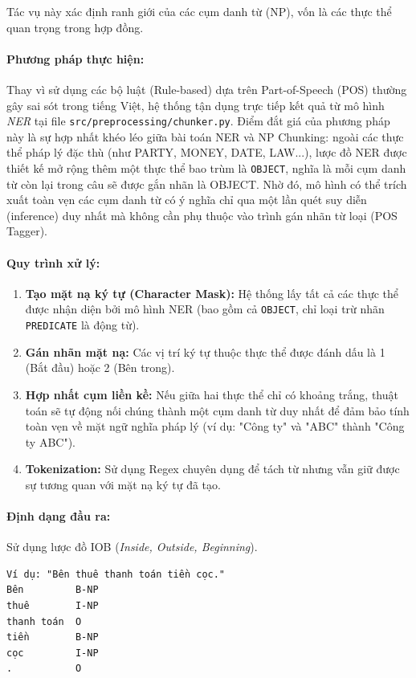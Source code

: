 Tác vụ này xác định ranh giới của các cụm danh từ (NP), vốn là các thực thể quan trọng trong hợp đồng.

\paragraph{Phương pháp thực hiện:}
Thay vì sử dụng các bộ luật (Rule-based) dựa trên Part-of-Speech (POS) thường gây sai sót trong tiếng Việt, hệ thống tận dụng trực tiếp kết quả từ mô hình \textit{NER} tại file \texttt{src/preprocessing/chunker.py}. Điểm đắt giá của phương pháp này là sự hợp nhất khéo léo giữa bài toán NER và NP Chunking: ngoài các thực thể pháp lý đặc thù (như PARTY, MONEY, DATE, LAW...), lược đồ NER được thiết kế mở rộng thêm một thực thể bao trùm là \texttt{OBJECT}, nghĩa là mỗi cụm danh từ còn lại trong câu sẽ được gắn nhãn là OBJECT. Nhờ đó, mô hình có thể trích xuất toàn vẹn các cụm danh từ có ý nghĩa chỉ qua một lần quét suy diễn (inference) duy nhất mà không cần phụ thuộc vào trình gán nhãn từ loại (POS Tagger).

\paragraph{Quy trình xử lý:}
\begin{enumerate}
    \item \textbf{Tạo mặt nạ ký tự (Character Mask):} Hệ thống lấy tất cả các thực thể được nhận diện bởi mô hình NER (bao gồm cả \texttt{OBJECT}, chỉ loại trừ nhãn \texttt{PREDICATE} là động từ).
    \item \textbf{Gán nhãn mặt nạ:} Các vị trí ký tự thuộc thực thể được đánh dấu là 1 (Bắt đầu) hoặc 2 (Bên trong).
    \item \textbf{Hợp nhất cụm liền kề:} Nếu giữa hai thực thể chỉ có khoảng trắng, thuật toán sẽ tự động nối chúng thành một cụm danh từ duy nhất để đảm bảo tính toàn vẹn về mặt ngữ nghĩa pháp lý (ví dụ: "Công ty" và "ABC" thành "Công ty ABC").
    \item \textbf{Tokenization:} Sử dụng Regex chuyên dụng để tách từ nhưng vẫn giữ được sự tương quan với mặt nạ ký tự đã tạo.
\end{enumerate}

\paragraph{Định dạng đầu ra:} Sử dụng lược đồ IOB (\textit{Inside, Outside, Beginning}).
\begin{verbatim}
Ví dụ: "Bên thuê thanh toán tiền cọc."
Bên         B-NP
thuê        I-NP
thanh toán  O
tiền        B-NP
cọc         I-NP
.           O
\end{verbatim}

